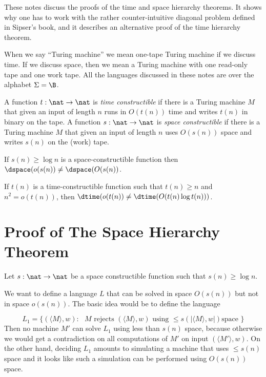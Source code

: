 \documentclass[11pt]{article}
\begin{document}
\sloppy




\bigskip

\noindent
These notes discuss the proofs of the time and space hierarchy theorems.
It shows why one has to work with the rather counter-intuitive diagonal
problem defined in Sipser's book, and it describes an alternative
proof of the time hierarchy theorem.


When we say ``Turing machine'' we mean one-tape Turing machine
if we discuss time. If we discuss 
space, then we mean a Turing machine with one read-only tape
and one work tape.
All the languages discussed in these notes are over the alphabet
$\Sigma = \B$.

\begin{definition}[Constructibility]
A function $t:\nat \to \nat$ is {\em time constructible}
if there is a Turing machine $M$ that given an input of
length $n$ runs in $O(t(n))$ time and writes $t(n)$ in
binary on the tape.
A function $s:\nat\to\nat$ is {\em space constructible}
if there is a Turing machine $M$ that given an input
of length $n$ uses $O(s(n))$ space and writes $s(n)$
on the (work) tape.
\end{definition}


\begin{theorem}
If $s(n)\geq \log n$ is a space-constructible function then
$\dspace(o(s(n)) \neq \dspace (O(s(n))$.
\end{theorem}



\begin{theorem}
If $t(n)$ is a time-constructible function such that $t(n)\geq n$ and
 $n^2 = o(t(n))$,  then
$\dtime (o(t(n)) \neq \dtime (O(t(n) \log t(n)))$.
\end{theorem}

\section{Proof of The Space Hierarchy Theorem}

Let $s:\nat \to \nat$ be a space constructible function such that $s(n) \geq \log n$.

We want to define a language $L$ that can be solved
in space $O(s(n))$ but not in space $o(s(n))$. The basic idea
would be to define the language

\[ L_1 = \{ ( \langle M \rangle, w) : \mbox{ $M$ rejects 
$( \langle M \rangle, w) $ using $\leq s(|\langle M \rangle, w|)$
space } \} \]
Then no machine $M'$ can solve $L_1$ using less than $s(n)$ space, because
otherwise we would get a contradiction on all computations of $M'$ on input
$( \langle M' \rangle, w)$. On the other hand, deciding $L_1$ amounts to 
simulating a machine that uses $\leq s(n)$ space and it looks like
such a simulation can be performed using $O(s(n))$ space.
\end{document}
